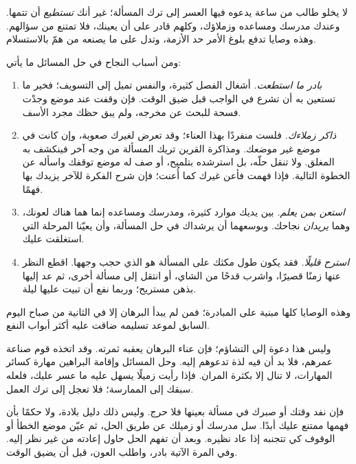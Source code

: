 \documentclass[../../../include/open-logic-section]{subfiles}
\begin{document}


لا يخلو طالب من ساعة يدعوه فيها العسر إلى ترك المسألة؛ غير أنك
\emph{تستطيع} أن تتمها. وعندك مدرسك ومساعده وزملاؤك، وكلهم قادر على
أن يعينك، فلا تمتنع من سؤالهم. وهذه وصايا تدفع بلوغ الأمر حد الأزمة،
وتدل على ما يصنعه من همّ بالاستسلام.

ومن أسباب النجاح في حل المسائل ما يأتي:
\begin{enumerate}
\item \emph{بادر ما استطعت.} أشغال الفصل كثيرة، والنفس تميل إلى
  التسويف؛ فخير ما تستعين به أن تشرع في الواجب قبل ضيق الوقت. فإن
  وقفت عند موضع وجدْت فسحة للبحث عن مخرجه، ولم يبق حظك مجرد الأسف.
\item \emph{ذاكر زملاءك.} فلست منفردًا بهذا العناء؛ وقد تعرض لغيرك
  صعوبة، وإن كانت في موضع غير موضعك. ومذاكرة القرين تريك المسألة من
  وجه آخر فينكشف به المغلق. ولا تنقل حلّه، بل استرشده بتلميح، أو صف له
  موضع توقفك واسأله عن الخطوة التالية. فإذا فهمت فأعن غيرك كما أُعنت؛
  فإن شرح الفكرة للآخر يزيدك بها فهمًا.
\item \emph{استعن بمن يعلم.} بين يديك موارد كثيرة، ومدرسك ومساعده
  إنما هما هناك لعونك، وهما \emph{يريدان} نجاحك. وبوسعهما أن يرشداك
  في حل المسألة، وأن يعيّنا المرحلة التي استغلقت عليك.
\item \emph{استرح قليلًا.} فقد يكون طول مكثك على المسألة هو الذي
  حجب وجهها. اقطع النظر عنها زمنًا قصيرًا، واشرب قدحًا من الشاي، أو
  انتقل إلى مسألة أخرى، ثم عد إليها بذهن مستريح؛ وربما نفع أن تبيت
  عليها ليلة.
\end{enumerate}

وهذه الوصايا كلها مبنية على المبادرة؛ فمن لم يبدأ البرهان إلا في
الثانية من صباح اليوم السابق لموعد تسليمه ضاقت عليه أكثر أبواب النفع.

وليس هذا دعوة إلى التشاؤم؛ فإن عناء البرهان يعقبه ثمرته. وقد اتخذه
قوم صناعة عمرهم، فلا بد أن فيه لذة تدعوهم إليه. وحل المسائل وإقامة
البراهين مهارة كسائر المهارات، لا تنال إلا بكثرة المران. فإذا رأيت
زميلًا يسهل عليه ما عسر عليك، فلعله سبقك إلى الممارسة؛ فلا تعجل إلى
ترك العمل.

فإن نفد وقتك أو صبرك في مسألة بعينها فلا حرج. وليس ذلك دليل بلادة،
ولا حكمًا بأن فهمها ممتنع عليك أبدًا. سل مدرسك أو زميلك عن طريق الحل،
ثم عيّن موضع الخطأ أو الوقوف كي تتجنبه إذا عاد نظيره. وبعد أن تفهم
الحل حاول إعادته من غير نظر إليه. وفي المرة الآتية بادر، واطلب العون،
قبل أن يضيق الوقت.
\end{document}
